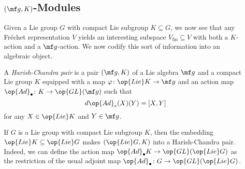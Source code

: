 \documentclass[../notes.tex]{subfiles}
\begin{document}
\subsection{\texorpdfstring{$(\mf g,K)$}{(g, K)}-Modules}
Given a Lie group $G$ with compact Lie subgroup $K\subseteq G$, we now see that any Fr\'echet representation $V$ yields an interesting subspace $V_{\mathrm{fin}}\subseteq V$ with both a $K$-action and a $\mf g$-action. We now codify this sort of information into an algebraic object.
\begin{definition}
	A \textit{Harish-Chandra pair} is a pair $(\mf g,K)$ of a Lie algebra $\mf g$ and a compact Lie group $K$ equipped with a map $\varphi\colon\op{Lie}K\to\mf g$ and an action map $\op{Ad}_\bullet\colon K\to\op{GL}(\mf g)$ such that
	\[d\op{Ad}_e(X)(Y)=[X,Y]\]
	for any $X\in\op{Lie}K$ and $Y\in\mf g$.
\end{definition}
\begin{example} \label{ex:prototypical-g-k-pair}
	If $G$ is a Lie group with compact Lie subgroup $K$, then the embedding $\op{Lie}K\subseteq\op{Lie}G$ makes $(\op{Lie}G,K)$ into a Harish-Chandra pair. Indeed, we can define the action map $\op{Ad}_\bullet K\to\op{GL}(\op{Lie}G)$ as the restriction of the usual adjoint map $\op{Ad}_\bullet\colon G\to\op{GL}(\op{Lie}G)$.
\end{example}
\end{document}
